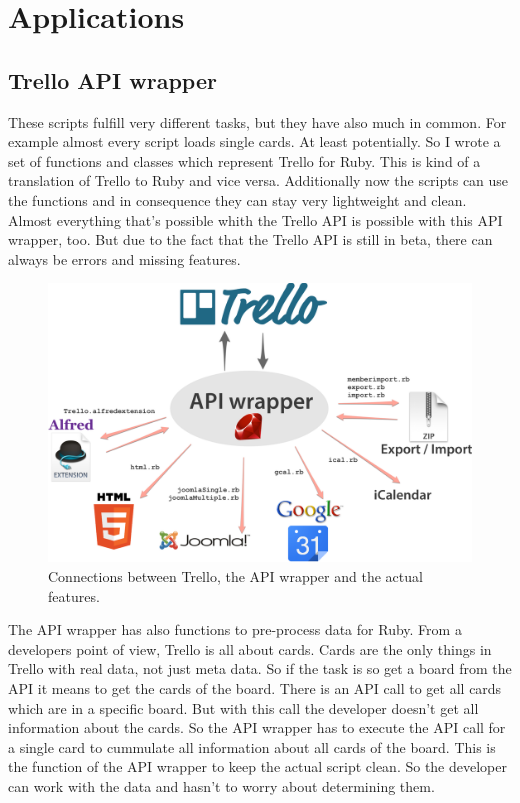 
\chapter{Applications}

\section{Trello API wrapper}
These scripts fulfill very different tasks, but they have also much in common. For example almost every script loads single cards. At least potentially. So I wrote a set of functions and classes which represent Trello for Ruby. This is kind of a translation of Trello to Ruby and vice versa. Additionally now the scripts can use the functions and in consequence they can stay very lightweight and clean. Almost everything that's possible whith the Trello API is possible with this API wrapper, too. But due to the fact that the Trello API is still in beta, there can always be errors and missing features. 

\begin{figure}[htb]
\centering
\includegraphics[width=\textwidth]{figures/api-wrapper}
\caption{Connections between Trello, the API wrapper and the actual features. \cite{ruby:icon}\cite{html:logo}\cite{joomla}\cite{google} }
\label{fig: api-wrapper}
\end{figure}

The API wrapper has also functions to pre-process data for Ruby. From a developers point of view, Trello is all about cards. Cards are the only things in Trello with real data, not just meta data. So if the task is so get a board from the API it means to get the cards of the board. There is an API call to get all cards which are in a specific board. But with this call the developer doesn't get all information about the cards. So the API wrapper has to execute the API call for a single card to cummulate all information about all cards of the board. This is the function of the API wrapper to keep the actual script clean. So the developer can work with the data and hasn't to worry about determining them.

